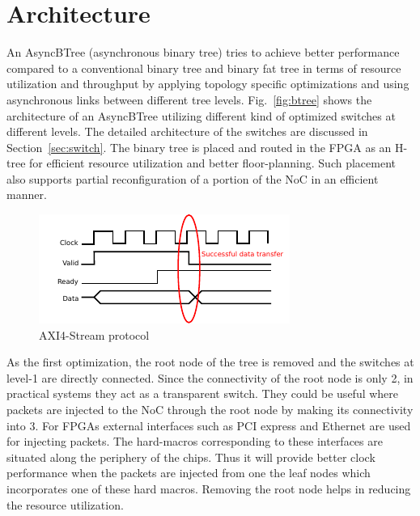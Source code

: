 \section{Architecture}
\label{sec:arch}


An AsyncBTree (asynchronous binary tree) tries to achieve better performance compared to a conventional binary tree and binary fat tree in terms of resource utilization and throughput by applying topology specific optimizations and using asynchronous links between different tree levels.
Fig.~\ref{fig:btree} shows the architecture of an AsyncBTree utilizing different kind of optimized switches at different levels.
The detailed architecture of the switches are discussed in Section~\ref{sec:switch}.
The binary tree is placed and routed in the FPGA as an H-tree for efficient resource utilization and better floor-planning.
Such placement also supports partial reconfiguration of a portion of the NoC in an efficient manner.

\begin{figure}[t]
\centering
   \includegraphics[width=\columnwidth]{Figures/axi.pdf}
   \caption{AXI4-Stream protocol}
   \label{fig:axi}
\end{figure}

As the first optimization, the root node of the tree is removed and the switches at level-1 are directly connected.
Since the connectivity of the root node is only 2, in practical systems they act as a transparent switch.
They could be useful where packets are injected to the NoC through the root node by making its connectivity into 3.
For FPGAs external interfaces such as PCI express and Ethernet are used for injecting packets.
The hard-macros corresponding to these interfaces are situated along the periphery of the chips.
Thus it will provide better clock performance when the packets are injected from one the leaf nodes which incorporates one of these hard macros.
Removing the root node helps in reducing the resource utilization.


